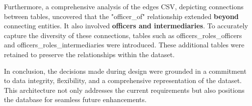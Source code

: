 \documentclass{article}
\begin{document}
Furthermore, a comprehensive analysis of the edges CSV, depicting connections between tables, uncovered that the "officer\_of" relationship extended \textbf{beyond} connecting entities. It also involved \textbf{officers and intermediaries}. To accurately capture the diversity of these connections, tables such as officers\_roles\_officers and officers\_roles\_intermediaries were introduced. These additional tables were retained to preserve the relationships within the dataset.

In conclusion, the decisions made during design were grounded in a commitment to data integrity, flexibility, and a comprehensive representation of the dataset. This architecture not only addresses the current requirements but also positions the database for seamless future enhancements.
\end{document}
